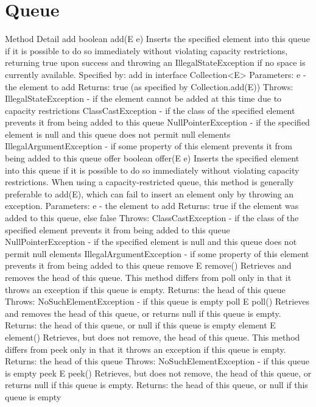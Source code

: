\documentclass{book}
\begin{document}
\section{Queue}
Method Detail
add
boolean add(E e)
Inserts the specified element into this queue if it is possible to do so immediately without violating capacity restrictions, returning true upon success and throwing an IllegalStateException if no space is currently available.
Specified by:
add in interface Collection<E>
Parameters:
e - the element to add
Returns:
true (as specified by Collection.add(E))
Throws:
IllegalStateException - if the element cannot be added at this time due to capacity restrictions
ClassCastException - if the class of the specified element prevents it from being added to this queue
NullPointerException - if the specified element is null and this queue does not permit null elements
IllegalArgumentException - if some property of this element prevents it from being added to this queue
offer
boolean offer(E e)
Inserts the specified element into this queue if it is possible to do so immediately without violating capacity restrictions. When using a capacity-restricted queue, this method is generally preferable to add(E), which can fail to insert an element only by throwing an exception.
Parameters:
e - the element to add
Returns:
true if the element was added to this queue, else false
Throws:
ClassCastException - if the class of the specified element prevents it from being added to this queue
NullPointerException - if the specified element is null and this queue does not permit null elements
IllegalArgumentException - if some property of this element prevents it from being added to this queue
remove
E remove()
Retrieves and removes the head of this queue. This method differs from poll only in that it throws an exception if this queue is empty.
Returns:
the head of this queue
Throws:
NoSuchElementException - if this queue is empty
poll
E poll()
Retrieves and removes the head of this queue, or returns null if this queue is empty.
Returns:
the head of this queue, or null if this queue is empty
element
E element()
Retrieves, but does not remove, the head of this queue. This method differs from peek only in that it throws an exception if this queue is empty.
Returns:
the head of this queue
Throws:
NoSuchElementException - if this queue is empty
peek
E peek()
Retrieves, but does not remove, the head of this queue, or returns null if this queue is empty.
Returns:
the head of this queue, or null if this queue is empty
\end{document}
